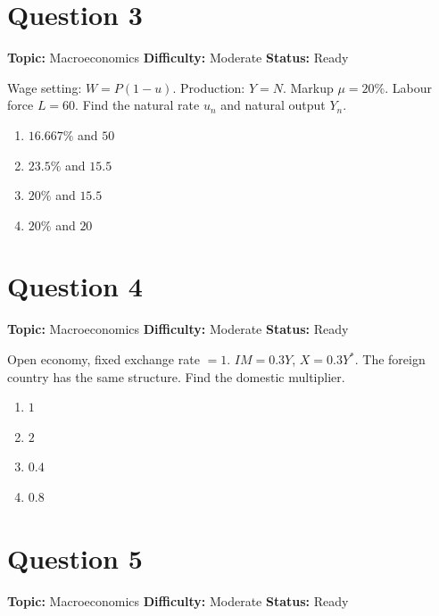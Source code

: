 \documentclass[11pt]{article}
\begin{document}
\section*{Question 3}


\noindent\textbf{Topic:} Macroeconomics \quad \textbf{Difficulty:} Moderate \quad \textbf{Status:} Ready



Wage setting: $W = P(1-u)$. Production: $Y = N$. Markup $\mu = 20\%$. Labour force $L = 60$. Find the natural rate $u_n$ and natural output $Y_n$.
\begin{enumerate}[label=(\Alph*)]
\item $16.667\%$ and $50$
\item $23.5\%$ and $15.5$
\item $20\%$ and $15.5$
\item $20\%$ and $20$
\end{enumerate}

\newpage

\section*{Question 4}


\noindent\textbf{Topic:} Macroeconomics \quad \textbf{Difficulty:} Moderate \quad \textbf{Status:} Ready



Open economy, fixed exchange rate $=1$. $IM = 0.3Y$, $X = 0.3Y^*$. The foreign country has the same structure. Find the domestic multiplier.

\begin{enumerate}[label=(\Alph*)]
\item $1$ \quad \item $2$ \quad \item $0.4$ \quad \item $0.8$
\end{enumerate}

\newpage

\section*{Question 5}


\noindent\textbf{Topic:} Macroeconomics \quad \textbf{Difficulty:} Moderate \quad \textbf{Status:} Ready
\end{document}
